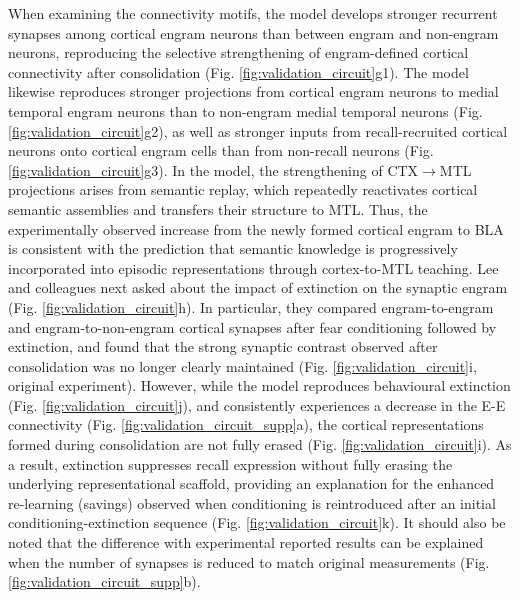 \documentclass{article}
\begin{document}
When examining the connectivity motifs, the model develops stronger recurrent synapses among cortical engram neurons than between engram and non-engram neurons, reproducing the selective strengthening of engram-defined cortical connectivity after consolidation (Fig. \ref{fig:validation_circuit}g1). The model likewise reproduces stronger projections from cortical engram neurons to medial temporal engram neurons than to non-engram medial temporal neurons (Fig. \ref{fig:validation_circuit}g2), as well as stronger inputs from recall-recruited cortical neurons onto cortical engram cells than from non-recall neurons (Fig. \ref{fig:validation_circuit}g3). In the model, the strengthening of CTX$\rightarrow$MTL projections arises from semantic replay, which repeatedly reactivates cortical semantic assemblies and transfers their structure to MTL. Thus, the experimentally observed increase from the newly formed cortical engram to BLA is consistent with the prediction that semantic knowledge is progressively incorporated into episodic representations through cortex-to-MTL teaching.
\newline\newline
Lee and colleagues next asked about the impact of extinction on the synaptic engram (Fig. \ref{fig:validation_circuit}h). In particular, they compared engram-to-engram and engram-to-non-engram cortical synapses after fear conditioning followed by extinction, and found that the strong synaptic contrast observed after consolidation was no longer clearly maintained (Fig. \ref{fig:validation_circuit}i, original experiment). However, while the model reproduces behavioural extinction (Fig. \ref{fig:validation_circuit}j), and consistently experiences a decrease in the E-E connectivity (Fig. \ref{fig:validation_circuit_supp}a), the cortical representations formed during consolidation are not fully erased (Fig. \ref{fig:validation_circuit}i). As a result, extinction suppresses recall expression without fully erasing the underlying representational scaffold, providing an explanation for the enhanced re-learning (savings) observed when conditioning is reintroduced after an initial conditioning-extinction sequence (Fig. \ref{fig:validation_circuit}k). It should also be noted that the difference with experimental reported results can be explained when the number of synapses is reduced to match original measurements (Fig. \ref{fig:validation_circuit_supp}b).
\end{document}
